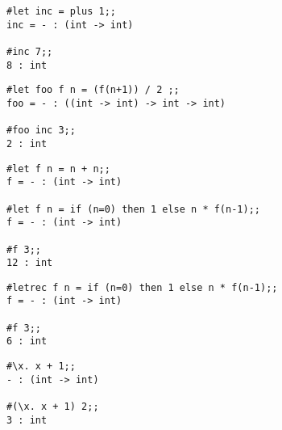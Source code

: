 
\begin{session}\begin{verbatim}
#let inc = plus 1;;
inc = - : (int -> int)

#inc 7;;
8 : int
\end{verbatim}\end{session}


\begin{session}\begin{verbatim}
#let foo f n = (f(n+1)) / 2 ;;
foo = - : ((int -> int) -> int -> int)

#foo inc 3;;
2 : int
\end{verbatim}\end{session}




\begin{session}\begin{verbatim}
#let f n = n + n;;
f = - : (int -> int)

#let f n = if (n=0) then 1 else n * f(n-1);;
f = - : (int -> int)

#f 3;;
12 : int
\end{verbatim}\end{session}


\begin{session}\begin{verbatim}
#letrec f n = if (n=0) then 1 else n * f(n-1);;
f = - : (int -> int)

#f 3;;
6 : int
\end{verbatim}\end{session}



\begin{session}\begin{verbatim}
#\x. x + 1;;
- : (int -> int)

#(\x. x + 1) 2;;
3 : int
\end{verbatim}\end{session}

